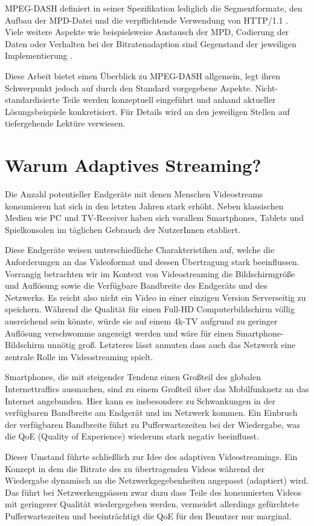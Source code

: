 \documentclass[paper = a4, fontsize = 12pt, parskip = half]{scrartcl} %
\begin{document}
MPEG-DASH definiert in seiner Spezifikation lediglich die Segmentformate, den Aufbau der MPD-Datei und die verpflichtende Verwendung von HTTP/1.1 \cite{mpeg_dynamic_2013}. Viele weitere Aspekte wie beispielsweise Austausch der MPD, Codierung der Daten oder Verhalten bei der Bitratenadaption sind Gegenstand der jeweiligen Implementierung \cite{sodagar_mpeg-dash_2011}.

Diese Arbeit bietet einen Überblick zu MPEG-DASH allgemein, legt ihren Schwerpunkt jedoch auf durch den Standard vorgegebene Aspekte. 
Nicht-standardisierte Teile werden konzeptuell eingeführt und anhand aktueller Lösungsbeispiele konkretisiert. Für Details wird an den jeweiligen Stellen auf tiefergehende Lektüre verwiesen.

\section{Warum Adaptives Streaming?}
Die Anzahl potentieller Endgeräte mit denen Menschen Videostreams konsumieren hat sich in den letzten Jahren stark erhöht. Neben klassischen Medien wie PC und TV-Receiver haben sich vorallem Smartphones, Tablets und Spielkonsolen im täglichen Gebrauch der NutzerInnen etabliert.

Diese Endgeräte weisen unterschiedliche Charakteristiken auf, welche die Anforderungen an das Videoformat und dessen Übertragung stark beeinflussen. Vorrangig betrachten wir im Kontext von Videostreaming die Bildschirmgröße und Auflösung sowie die Verfügbare Bandbreite des Endgeräts und des Netzwerks.
Es reicht also nicht ein Video in einer einzigen Version Serverseitig zu speichern. Während die Qualität für einen Full-HD Computerbildschirm völlig ausreichend sein könnte, würde sie auf einem 4k-TV aufgrund zu geringer Auflösung verschwomme angezeigt werden und wäre für einen Smartphone-Bildschirm unnötig groß. Letzteres lässt anmuten dass auch das Netzwerk eine zentrale Rolle im Videostreaming spielt.

Smartphones, die mit steigender Tendenz einen Großteil des globalen Internettraffics ausmachen, sind zu einem Großteil über das Mobilfunknetz an das Internet angebunden. Hier kann es insbesondere zu Schwankungen in der verfügbaren Bandbreite am Endgerät und im Netzwerk kommen. Ein Einbruch der verfügbaren Bandbreite führt zu Pufferwartezeiten bei der Wiedergabe, was die QoE (Quality of Experience) wiederum stark negativ beeinflusst. 

Dieser Umstand führte schließlich zur Idee des adaptiven Videostreamings. Ein Konzept in dem die Bitrate des zu übertragenden Videos während der Wiedergabe dynamisch an die Netzwerkgegebenheiten angepasst (adaptiert) wird. Das führt bei Netzwerkengpässen zwar dazu dass Teile des konsumierten Videos mit geringerer Qualität wiedergegeben werden, vermeidet allerdings gefürchtete Pufferwartezeiten und beeinträchtigt die QoE für den Benutzer nur marginal.
\end{document}
